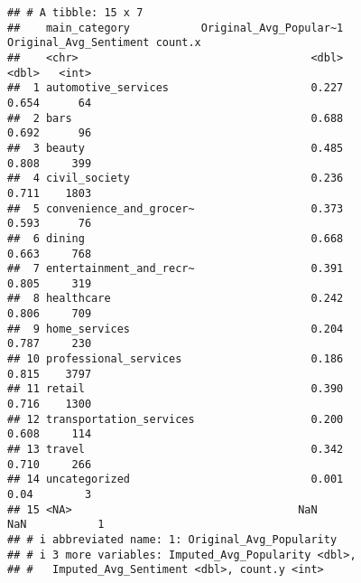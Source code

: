 \documentclass[
]{article}
\begin{document}
\begin{verbatim}
## # A tibble: 15 x 7
##    main_category           Original_Avg_Popular~1 Original_Avg_Sentiment count.x
##    <chr>                                    <dbl>                  <dbl>   <int>
##  1 automotive_services                      0.227                  0.654      64
##  2 bars                                     0.688                  0.692      96
##  3 beauty                                   0.485                  0.808     399
##  4 civil_society                            0.236                  0.711    1803
##  5 convenience_and_grocer~                  0.373                  0.593      76
##  6 dining                                   0.668                  0.663     768
##  7 entertainment_and_recr~                  0.391                  0.805     319
##  8 healthcare                               0.242                  0.806     709
##  9 home_services                            0.204                  0.787     230
## 10 professional_services                    0.186                  0.815    3797
## 11 retail                                   0.390                  0.716    1300
## 12 transportation_services                  0.200                  0.608     114
## 13 travel                                   0.342                  0.710     266
## 14 uncategorized                            0.001                  0.04        3
## 15 <NA>                                   NaN                    NaN           1
## # i abbreviated name: 1: Original_Avg_Popularity
## # i 3 more variables: Imputed_Avg_Popularity <dbl>,
## #   Imputed_Avg_Sentiment <dbl>, count.y <int>
\end{verbatim}
\end{document}
